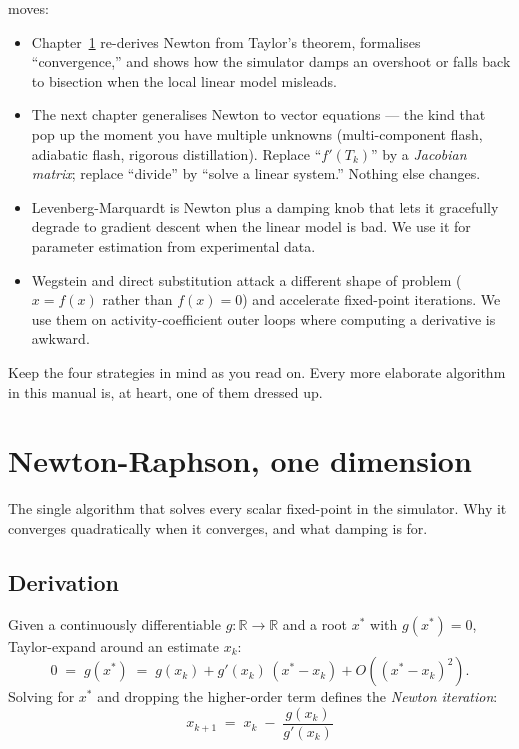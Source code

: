 \documentclass[11pt,a4paper]{article}
\newcommand{\R}{\mathbb{R}}
\begin{document}
moves:
\begin{itemize}[leftmargin=*,nosep]
  \item Chapter~\ref{ch:nr1d} re-derives Newton from Taylor's
        theorem, formalises ``convergence,'' and shows how the
        simulator damps an overshoot or falls back to bisection
        when the local linear model misleads.
  \item The next chapter generalises Newton to vector equations
        --- the kind that pop up the moment you have multiple
        unknowns (multi-component flash, adiabatic flash, rigorous
        distillation).  Replace ``$f'(T_k)$'' by a \emph{Jacobian
        matrix}; replace ``divide'' by ``solve a linear system.''
        Nothing else changes.
  \item Levenberg-Marquardt is Newton plus a damping knob that
        lets it gracefully degrade to gradient descent when the
        linear model is bad.  We use it for parameter estimation
        from experimental data.
  \item Wegstein and direct substitution attack a different shape
        of problem ($x = f(x)$ rather than $f(x) = 0$) and
        accelerate fixed-point iterations.  We use them on
        activity-coefficient outer loops where computing a
        derivative is awkward.
\end{itemize}

Keep the four strategies in mind as you read on.  Every more elaborate
algorithm in this manual is, at heart, one of them dressed up.

\section{Newton-Raphson, one dimension}\label{ch:nr1d}

\begin{whatyoulllearn}
The single algorithm that solves every scalar fixed-point in the
simulator. Why it converges quadratically when it converges, and what
damping is for.
\end{whatyoulllearn}

\subsection{Derivation}

Given a continuously differentiable $g \colon \R \to \R$ and a root
$x^*$ with $g(x^*) = 0$, Taylor-expand around an estimate $x_k$:
\[
   0 \;=\; g(x^*) \;=\; g(x_k) + g'(x_k)\,(x^* - x_k) + O((x^* - x_k)^2).
\]
Solving for $x^*$ and dropping the higher-order term defines the
\emph{Newton iteration}:
\begin{equation}
   \boxed{\;
   x_{k+1} \;=\; x_k \;-\; \frac{g(x_k)}{g'(x_k)}
   \;}
   \label{eq:newton-1d}
\end{equation}
\end{document}
